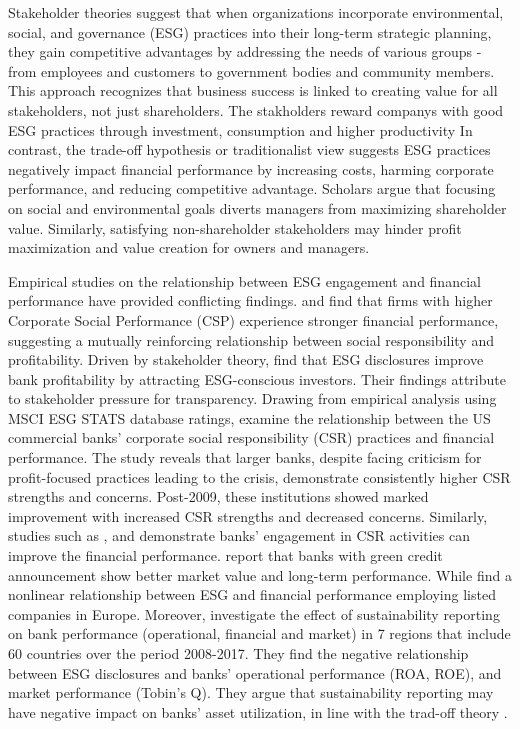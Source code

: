 \documentclass[
  authoryear]{elsarticle}
\begin{document}
Stakeholder theories \citep[see][]{FREEMAN1984, DEEGAN2002} suggest that
when organizations incorporate environmental, social, and governance
(ESG) practices into their long-term strategic planning, they gain
competitive advantages by addressing the needs of various groups - from
employees and customers to government bodies and community members. This
approach recognizes that business success is linked to creating value
for all stakeholders, not just shareholders. The stakholders reward
companys with good ESG practices through investment, consumption and
higher productivity \citep{LI2018}In contrast, the trade-off hypothesis
or traditionalist view \citep[see][]{FRIEDMAN2007} suggests ESG
practices negatively impact financial performance by increasing costs,
harming corporate performance, and reducing competitive advantage.
Scholars argue that focusing on social and environmental goals diverts
managers from maximizing shareholder value. Similarly, satisfying
non-shareholder stakeholders may hinder profit maximization and value
creation for owners and managers\citep{GALANT2017}.

Empirical studies on the relationship between ESG engagement and
financial performance have provided conflicting findings.
\citet{BEN_LAHOUEL2019} and \citet{BEN_LAHOUEL2021} find that firms with
higher Corporate Social Performance (CSP) experience stronger financial
performance, suggesting a mutually reinforcing relationship between
social responsibility and profitability. Driven by stakeholder theory,
\citet{WU2013} find that ESG disclosures improve bank profitability by
attracting ESG-conscious investors. Their findings attribute to
stakeholder pressure for transparency. Drawing from empirical analysis
using MSCI ESG STATS database ratings, \citet{CORNETT2016} examine the
relationship between the US commercial banks' corporate social
responsibility (CSR) practices and financial performance. The study
reveals that larger banks, despite facing criticism for profit-focused
practices leading to the crisis, demonstrate consistently higher CSR
strengths and concerns. Post-2009, these institutions showed marked
improvement with increased CSR strengths and decreased concerns.
Similarly, studies such as \citet{CARNEVALE2014}, \citet{SHEN2016} and
\citet{BUALLAY2021} demonstrate banks' engagement in CSR activities can
improve the financial performance. \citet{TIAN2023} report that banks
with green credit announcement show better market value and long-term
performance. While \citet{FERRERO2016} find a nonlinear relationship
between ESG and financial performance employing listed companies in
Europe. Moreover, \citet{BUALLAY2023} investigate the effect of
sustainability reporting on bank performance (operational, financial and
market) in 7 regions that include 60 countries over the period
2008-2017. They find the negative relationship between ESG disclosures
and banks' operational performance (ROA, ROE), and market performance
(Tobin's Q). They argue that sustainability reporting may have negative
impact on banks' asset utilization, in line with the trad-off theory
\citep[see][]{LEE2009}.
\end{document}
